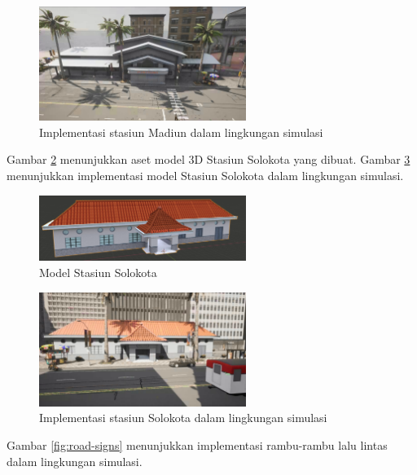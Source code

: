 \begin{figure}[!h]
    \centering
    \includegraphics[width=0.6\textwidth]{resources/chapter-4/stasiun-madiun-carla.png}
    \caption{Implementasi stasiun Madiun dalam lingkungan simulasi}
    \label{fig:stasiun-madiun}
\end{figure}

Gambar \ref{fig:stasiun-solokota-model} menunjukkan aset model 3D Stasiun
Solokota yang dibuat. Gambar \ref{fig:stasiun-solokota} menunjukkan implementasi
model Stasiun Solokota dalam lingkungan simulasi.

\begin{figure}[!h]
    \centering
    \includegraphics[width=0.6\textwidth]{resources/chapter-3-stasiun-solokota-model.png}
    \caption{Model Stasiun Solokota}
    \label{fig:stasiun-solokota-model}
\end{figure}

\begin{figure}[!h]
    \centering
    \includegraphics[width=0.6\textwidth]{resources/chapter-4/stasiun-solokota-carla.png}
    \caption{Implementasi stasiun Solokota dalam lingkungan simulasi}
    \label{fig:stasiun-solokota}
\end{figure}

Gambar \ref{fig:road-signs} menunjukkan implementasi rambu-rambu lalu lintas
dalam lingkungan simulasi.


